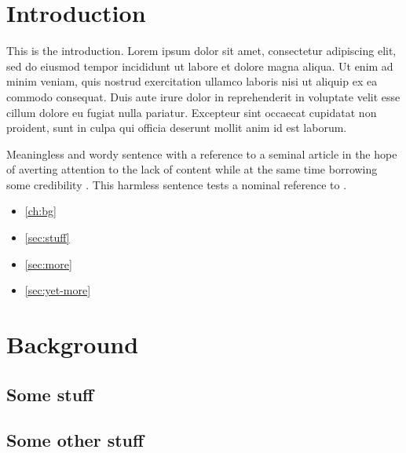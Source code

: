 \documentclass[english]{ufsc-thesis-rn46-2019}
\begin{document}
\pretextual%
\imprimircapa%
\imprimirfolhaderosto*%
\clearpage
\tableofcontents*%
\textual%
\cleardoublepage

\chapter{Introduction}

This is the introduction. Lorem ipsum dolor sit amet, consectetur adipiscing elit, sed do eiusmod tempor incididunt ut labore et dolore magna aliqua. Ut enim ad minim veniam, quis nostrud exercitation ullamco laboris nisi ut aliquip ex ea commodo consequat. Duis aute irure dolor in reprehenderit in voluptate velit esse cillum dolore eu fugiat nulla pariatur. Excepteur sint occaecat cupidatat non proident, sunt in culpa qui officia deserunt mollit anim id est laborum.

Meaningless and wordy sentence with a reference to a seminal article in the hope of averting attention to the lack of content while at the same time borrowing some credibility \cite{turing1937computable}. This harmless sentence tests a nominal reference to .

\begin{itemize}
\item \autoref{ch:bg}
\item \autoref{sec:stuff}
\item \autoref{sec:more}
\item \autoref{sec:yet-more}
\end{itemize}

\lipsum[1]

\chapter{Background}
\label{ch:bg}

\lipsum[1]

\section{Some stuff}
\label{sec:stuff}

\lipsum[1]

\section{Some other stuff}
\end{document}
